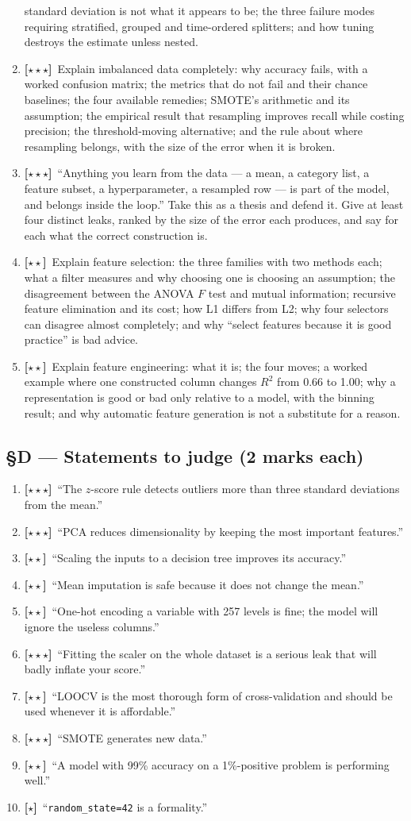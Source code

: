 \documentclass[11pt,a4paper]{article}
\newcommand{\LA}{{\footnotesize\textbf{[$\star\star\star$]}}}
\newcommand{\LB}{{\footnotesize\textbf{[$\star\star$]}}}
\newcommand{\LC}{{\footnotesize\textbf{[$\star$]}}}
\newcommand{\Q}[1]{\item[\textbf{#1}]}
\begin{document}
\begin{enumerate}[leftmargin=2.2cm]
  standard deviation is not what it appears to be; the three failure modes
  requiring stratified, grouped and time-ordered splitters; and how tuning
  destroys the estimate unless nested.
\Q{U4.83}\LA\ Explain imbalanced data completely: why accuracy fails, with a
  worked confusion matrix; the metrics that do not fail and their chance
  baselines; the four available remedies; SMOTE's arithmetic and its
  assumption; the empirical result that resampling improves recall while
  costing precision; the threshold-moving alternative; and the rule about where
  resampling belongs, with the size of the error when it is broken.
\Q{U4.84}\LA\ ``Anything you learn from the data --- a mean, a category list, a
  feature subset, a hyperparameter, a resampled row --- is part of the model,
  and belongs inside the loop.'' Take this as a thesis and defend it. Give at
  least four distinct leaks, ranked by the size of the error each produces, and
  say for each what the correct construction is.
\Q{U4.85}\LB\ Explain feature selection: the three families with two methods
  each; what a filter measures and why choosing one is choosing an assumption;
  the disagreement between the ANOVA $F$ test and mutual information; recursive
  feature elimination and its cost; how L1 differs from L2; why four selectors
  can disagree almost completely; and why ``select features because it is good
  practice'' is bad advice.
\Q{U4.86}\LB\ Explain feature engineering: what it is; the four moves; a worked
  example where one constructed column changes $R^2$ from 0.66 to 1.00; why a
  representation is good or bad only relative to a model, with the binning
  result; and why automatic feature generation is not a substitute for a
  reason.
\end{enumerate}

\subsection*{§D --- Statements to judge (2 marks each)}

\begin{enumerate}[leftmargin=2.2cm]
\Q{U4.87}\LA\ ``The $z$-score rule detects outliers more than three standard
  deviations from the mean.''
\Q{U4.88}\LA\ ``PCA reduces dimensionality by keeping the most important
  features.''
\Q{U4.89}\LB\ ``Scaling the inputs to a decision tree improves its accuracy.''
\Q{U4.90}\LB\ ``Mean imputation is safe because it does not change the mean.''
\Q{U4.91}\LB\ ``One-hot encoding a variable with 257 levels is fine; the model
  will ignore the useless columns.''
\Q{U4.92}\LA\ ``Fitting the scaler on the whole dataset is a serious leak that
  will badly inflate your score.''
\Q{U4.93}\LB\ ``LOOCV is the most thorough form of cross-validation and should
  be used whenever it is affordable.''
\Q{U4.94}\LA\ ``SMOTE generates new data.''
\Q{U4.95}\LB\ ``A model with 99\% accuracy on a 1\%-positive problem is
  performing well.''
\Q{U4.96}\LC\ ``\texttt{random\_state=42} is a formality.''
\end{enumerate}
\end{document}
